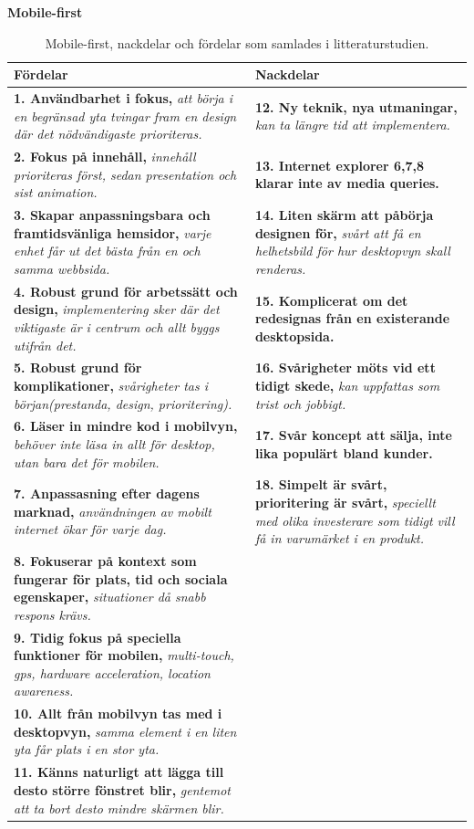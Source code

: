 \documentclass[11pt]{article}
\begin{document}
\textbf{Mobile-first}
\begin{table}[H]
\centering
\begin{tabular}{|p{7.2cm}|p{7.2cm}|}
\hline
Fördelar&Nackdelar\\ \hline
\textbf{1. Användbarhet i fokus, }\textit{att börja i en begränsad yta tvingar fram en design där det nödvändigaste prioriteras.}&\textbf{12. Ny teknik, nya utmaningar,} \textit{kan ta längre tid att implementera.}\\ \hline
\textbf{2. Fokus på innehåll, }\textit{innehåll prioriteras först, sedan presentation och sist animation.}&\textbf{13. Internet explorer 6,7,8 klarar inte av media queries.} \\ \hline
\textbf{3. Skapar anpassningsbara och framtidsvänliga hemsidor, }\textit{varje enhet får ut det bästa från en och samma webbsida.}&\textbf{14. Liten skärm att påbörja designen för, } \textit{svårt att få en helhetsbild för hur desktopvyn skall renderas.}\\ \hline
\textbf{4. Robust grund för arbetssätt och design, }\textit{implementering sker där det viktigaste är i centrum och allt byggs utifrån det.}&\textbf{15. Komplicerat om det redesignas från en existerande desktopsida.}\\ \hline
\textbf{5. Robust grund för komplikationer, }\textit{svårigheter tas i början(prestanda, design, prioritering).}&\textbf{16. Svårigheter möts vid ett tidigt skede, } \textit{kan uppfattas som trist och jobbigt.}\\ \hline
\textbf{6. Läser in mindre kod i mobilvyn, }\textit{behöver inte läsa in allt för desktop, utan bara det för mobilen.}&\textbf{17. Svår koncept att sälja, inte lika populärt bland kunder.}\\ \hline
\textbf{7. Anpassasning efter dagens marknad, }\textit{användningen av mobilt internet ökar för varje dag.}&\textbf{18. Simpelt är svårt, prioritering är svårt, } \textit{speciellt med olika investerare som tidigt vill få in varumärket i en produkt.}\\ \hline
\textbf{8. Fokuserar på kontext som fungerar för plats, tid och sociala egenskaper, }\textit{situationer då snabb respons krävs.}&~\\ \hline
\textbf{9. Tidig fokus på speciella funktioner för mobilen, }\textit{multi-touch, gps, hardware acceleration, location awareness.}&~\\ \hline
\textbf{10. Allt från mobilvyn tas med i desktopvyn, }\textit{samma element i en liten yta får plats i en stor yta.}&~\\ \hline
\textbf{11. Känns naturligt att lägga till desto större fönstret blir, }\textit{gentemot att ta bort desto mindre skärmen blir.}&~\\ \hline

    \end{tabular}
    \caption {Mobile-first, nackdelar och fördelar som samlades i litteraturstudien.}
\end{table}
\newpage
\end{document}
